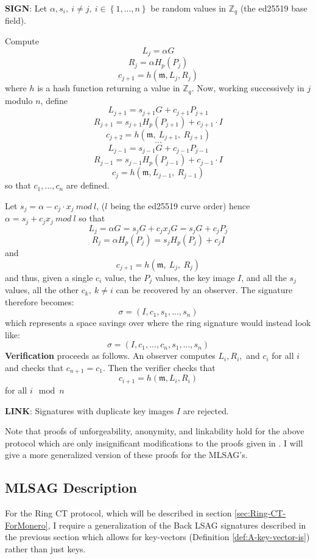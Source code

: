 \documentclass[12pt,english]{mrl}
\theoremstyle{definition}
\numberwithin{equation}{section}
\numberwithin{figure}{section}
\numberwithin{equation}{section}
\numberwithin{equation}{section}
\numberwithin{figure}{section}
\begin{document}
\textbf{SIGN}: Let $\alpha,s_{i},\ i\neq j,\ i\in\left\{ 1,...,n\right\} $
be random values in $\mathbb{Z}_{q}$ (the ed25519 base field). 

Compute
\[
L_{j}=\alpha G
\]
\[
R_{j}=\alpha H_p\left(P_{j}\right)
\]
\[
c_{j+1}=h\left(\mathfrak{m},L_{j},R_{j}\right)
\]
 where $h$ is a hash function returning a value in $\mathbb{Z}_{q}$.
Now, working successively in $j$ modulo $n$, define 
\[
L_{j+1}=s_{j+1}G+c_{j+1}P_{j+1}
\]
\[
R_{j+1}=s_{j+1}H_p\left(P_{j+1}\right)+c_{j+1}\cdot I
\]
\[
c_{j+2}=h\left(\mathfrak{m},\ L_{j+1},\ R_{j+1}\right)
\]
\[
\cdots
\]
\[
L_{j-1}=s_{j-1}G+c_{j-1}P_{j-1}
\]
\[
R_{j-1}=s_{j-1}H_p\left(P_{j-1}\right)+c_{j-1}\cdot I
\]
\[
c_{j}=h\left(\mathfrak{m},L_{j-1},\ R_{j-1}\right)
\]
 so that $c_{1},...,c_{n}$ are defined. 

Let $s_{j}=\alpha-c_{j}\cdot x_j\ mod\ l$, ($l$ being the ed25519
curve order) hence $\alpha=s_{j}+c_{j}x_j\ mod\ l$ so that 
\[
L_{j}=\alpha G=s_{j}G+c_{j}x_jG=s_{j}G+c_{j}P_{j}
\]
\[
R_{j}=\alpha 
H_p\left(P_{j}\right)=s_{j}H_p\left(P_{j}\right)+c_{j}I
\]
and 
\[
c_{j+1}=h\left(\mathfrak{m},\ L_{j},\ R_{j}\right)
\]
 and thus, given a single $c_{i}$ value, the $P_{j}$ values, the
key image $I$, and all the $s_{j}$ values, all the other $c_{k},\ k\neq i$
can be recovered by an observer. The signature therefore becomes:
\[
\sigma=\left(I,c_{1},s_{1},...,s_{n}\right)
\]
 which represents a space savings over \cite[4.4]{CN} where the ring signature would instead look like: 
 \[
\sigma=\left(I,c_{1}, ..., c_{n},s_{1},...,s_{n}\right)
\]
\textbf{Verification }proceeds as follows. An observer computes $L_{i},R_{i},$
and $c_{i}$ for all $i$ and checks that $c_{n+1}=c_{1}$. Then the
verifier checks that 
\[
c_{i+1}=h\left(\mathfrak{m},L_{i},R_{i}\right)
\]
 for all $i\mod n$ 

\textbf{LINK}: Signatures with duplicate key images $I$ are rejected. 

Note that proofs of unforgeability, anonymity, and linkability
hold for the above protocol which are only insignificant modifications to the proofs
given in \cite{LWW}. I will give a more generalized version of these
proofs for the MLSAG's. 
\subsection{\label{sub:MLSAG-Description}MLSAG Description}


For the Ring CT protocol, which will be described in section
\ref{sec:Ring-CT-ForMonero}, I require a generalization of the Back
LSAG signatures described in the previous section which allows for key-vectors (Definition
\ref{def:A-key-vector-is}) rather than just keys. 
\end{document}
